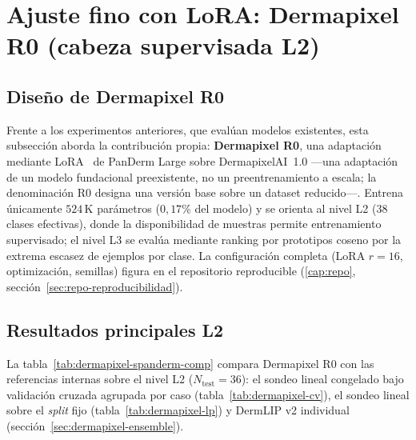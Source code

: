 \section{Ajuste fino con LoRA: Dermapixel R0 (cabeza supervisada L2)}
\label{sec:dermapixel-spanderm-v0}

\subsection{Diseño de Dermapixel R0}

Frente a los experimentos anteriores, que evalúan modelos existentes,
esta subsección aborda la contribución propia: \textbf{Dermapixel R0},
una adaptación mediante LoRA~\cite{lora} de PanDerm Large sobre
DermapixelAI~1.0 ---una adaptación de un modelo fundacional
preexistente, no un preentrenamiento a escala; la denominación R0
designa una versión base sobre un dataset reducido---. Entrena
únicamente $524$\,K parámetros ($0{,}17\%$ del modelo) y se orienta al
nivel L2 ($38$ clases efectivas), donde la disponibilidad de muestras
permite entrenamiento supervisado; el nivel L3 se evalúa mediante
ranking por prototipos coseno por la extrema escasez de ejemplos por
clase. La configuración completa (LoRA $r=16$, optimización,
semillas) figura en el repositorio reproducible (\ref{cap:repo},
sección~\ref{sec:repo-reproducibilidad}).

\subsection{Resultados principales L2}

La tabla~\ref{tab:dermapixel-spanderm-comp} compara Dermapixel R0 con
las referencias internas sobre el nivel L2 ($N_{\mathrm{test}} = 36$):
el sondeo lineal congelado bajo validación cruzada agrupada por caso
(tabla~\ref{tab:dermapixel-cv}), el sondeo lineal sobre el \emph{split}
fijo (tabla~\ref{tab:dermapixel-lp}) y DermLIP v2 individual
(sección~\ref{sec:dermapixel-ensemble}).

